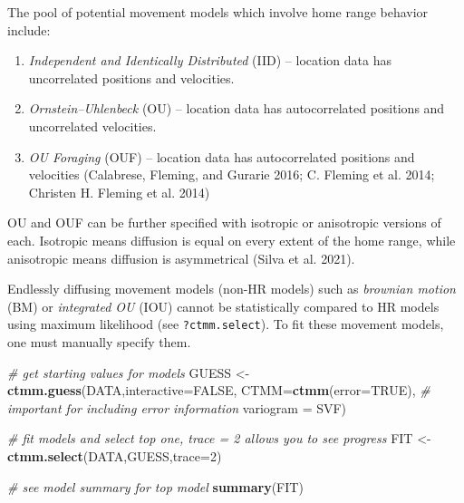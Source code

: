 \documentclass[
]{article}
\newenvironment{Shaded}{\begin{snugshade}}{\end{snugshade}}
\newcommand{\AttributeTok}[1]{\textcolor[rgb]{0.13,0.29,0.53}{#1}}
\newcommand{\CommentTok}[1]{\textcolor[rgb]{0.56,0.35,0.01}{\textit{#1}}}
\newcommand{\ConstantTok}[1]{\textcolor[rgb]{0.56,0.35,0.01}{#1}}
\newcommand{\DecValTok}[1]{\textcolor[rgb]{0.00,0.00,0.81}{#1}}
\newcommand{\FunctionTok}[1]{\textcolor[rgb]{0.13,0.29,0.53}{\textbf{#1}}}
\newcommand{\NormalTok}[1]{#1}
\newcommand{\OtherTok}[1]{\textcolor[rgb]{0.56,0.35,0.01}{#1}}
\begin{document}
The pool of potential movement models which involve home range behavior
include:

\begin{enumerate}
\def\labelenumi{\arabic{enumi})}
\item
  \emph{Independent and Identically Distributed} (IID) -- location data
  has uncorrelated positions and velocities.
\item
  \emph{Ornstein--Uhlenbeck} (OU) -- location data has autocorrelated
  positions and uncorrelated velocities.
\item
  \emph{OU Foraging} (OUF) -- location data has autocorrelated positions
  and velocities (Calabrese, Fleming, and Gurarie 2016; C. Fleming et
  al. 2014; Christen H. Fleming et al. 2014)
\end{enumerate}

OU and OUF can be further specified with isotropic or anisotropic
versions of each. Isotropic means diffusion is equal on every extent of
the home range, while anisotropic means diffusion is asymmetrical (Silva
et al. 2021).

Endlessly diffusing movement models (non-HR models) such as
\emph{brownian motion} (BM) or \emph{integrated OU} (IOU) cannot be
statistically compared to HR models using maximum likelihood (see
\texttt{?ctmm.select}). To fit these movement models, one must manually
specify them.

\begin{Shaded}
\begin{Highlighting}[]
\CommentTok{\# get starting values for models}
\NormalTok{GUESS }\OtherTok{\textless{}{-}} \FunctionTok{ctmm.guess}\NormalTok{(DATA,}\AttributeTok{interactive=}\ConstantTok{FALSE}\NormalTok{, }
                    \AttributeTok{CTMM=}\FunctionTok{ctmm}\NormalTok{(}\AttributeTok{error=}\ConstantTok{TRUE}\NormalTok{), }\CommentTok{\# important for including error information}
                    \AttributeTok{variogram =}\NormalTok{ SVF) }

\CommentTok{\# fit models and select top one, trace = 2 allows you to see progress}
\NormalTok{FIT }\OtherTok{\textless{}{-}} \FunctionTok{ctmm.select}\NormalTok{(DATA,GUESS,}\AttributeTok{trace=}\DecValTok{2}\NormalTok{)}
\end{Highlighting}
\end{Shaded}

\begin{Shaded}
\begin{Highlighting}[]
\CommentTok{\# see model summary for top model}
\FunctionTok{summary}\NormalTok{(FIT)}
\end{Highlighting}
\end{Shaded}
\end{document}
